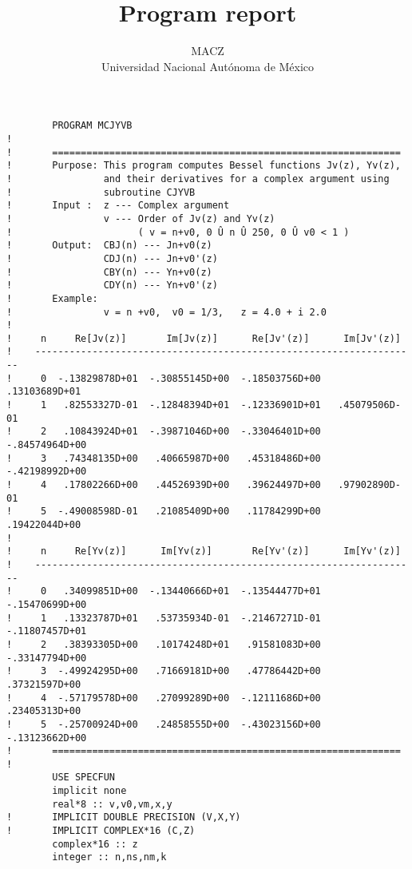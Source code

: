 \documentclass [11pt,spanish]{article}
\begin{document}
\title {Program report}
\author {MACZ\\
Universidad Nacional Aut\'onoma de M\'exico}
\maketitle 

\begingroup
\fontsize{10pt}{12pt}
\selectfont
{}
\begin{shaded}
\begin{verbatim}
        PROGRAM MCJYVB
!
!       =============================================================
!       Purpose: This program computes Bessel functions Jv(z), Yv(z),
!                and their derivatives for a complex argument using
!                subroutine CJYVB
!       Input :  z --- Complex argument
!                v --- Order of Jv(z) and Yv(z)
!                      ( v = n+v0, 0 Û n Û 250, 0 Û v0 < 1 )
!       Output:  CBJ(n) --- Jn+v0(z)
!                CDJ(n) --- Jn+v0'(z)
!                CBY(n) --- Yn+v0(z)
!                CDY(n) --- Yn+v0'(z)
!       Example:
!                v = n +v0,  v0 = 1/3,   z = 4.0 + i 2.0
!
!     n     Re[Jv(z)]       Im[Jv(z)]      Re[Jv'(z)]      Im[Jv'(z)]
!    -------------------------------------------------------------------
!     0  -.13829878D+01  -.30855145D+00  -.18503756D+00   .13103689D+01
!     1   .82553327D-01  -.12848394D+01  -.12336901D+01   .45079506D-01
!     2   .10843924D+01  -.39871046D+00  -.33046401D+00  -.84574964D+00
!     3   .74348135D+00   .40665987D+00   .45318486D+00  -.42198992D+00
!     4   .17802266D+00   .44526939D+00   .39624497D+00   .97902890D-01
!     5  -.49008598D-01   .21085409D+00   .11784299D+00   .19422044D+00
!
!     n     Re[Yv(z)]      Im[Yv(z)]       Re[Yv'(z)]      Im[Yv'(z)]
!    -------------------------------------------------------------------
!     0   .34099851D+00  -.13440666D+01  -.13544477D+01  -.15470699D+00
!     1   .13323787D+01   .53735934D-01  -.21467271D-01  -.11807457D+01
!     2   .38393305D+00   .10174248D+01   .91581083D+00  -.33147794D+00
!     3  -.49924295D+00   .71669181D+00   .47786442D+00   .37321597D+00
!     4  -.57179578D+00   .27099289D+00  -.12111686D+00   .23405313D+00
!     5  -.25700924D+00   .24858555D+00  -.43023156D+00  -.13123662D+00
!       =============================================================
!
        USE SPECFUN
        implicit none
        real*8 :: v,v0,vm,x,y
!       IMPLICIT DOUBLE PRECISION (V,X,Y)
!       IMPLICIT COMPLEX*16 (C,Z)
        complex*16 :: z
        integer :: n,ns,nm,k

\end{verbatim}
\end{shaded}
\end{document}
